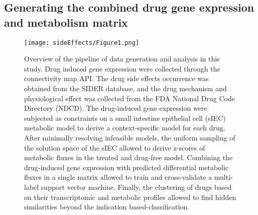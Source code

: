 \subsection{Generating the combined drug gene expression and metabolism matrix}
\begin{figure}[!ht]
\centering
	\texttt{[image: sideEffects/Figure1.png]}%
	\caption[Overview of the automatic data collection pipeline.]{Overview of the pipeline of data generation and analysis in this study. Drug induced gene expression were collected through the connectivity map API. The drug side effects occurrence was obtained from the SIDER database, and the drug mechanism and physiological effect was collected from the FDA National Drug Code Directory (NDCD). The drug-induced gene expression were subjected as constraints on a small intestine epithelial cell (sIEC) metabolic model to derive a context-specific model for each drug. After minimally resolving infeasible models, the uniform sampling of the solution space of the sIEC allowed to derive z-scores of metabolic fluxes in the treated and drug-free model. Combining the drug-induced gene expression with predicted differential metabolic fluxes in a single matrix allowed to train and cross-validate a multi-label support vector machine. Finally, the clustering of drugs based on their transcriptomic and metabolic profiles allowed to find hidden similarities beyond the indication based-classification.}
	\label{fig:seff1}
\end{figure}
